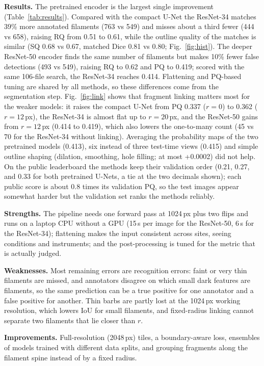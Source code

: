 \documentclass[sigconf]{acmart}
\begin{document}
\textbf{Results.} The pretrained encoder is the largest single improvement (Table~\ref{tab:results}). Compared with the compact U-Net the ResNet-34 matches 39\% more annotated filaments (763 vs 549) and misses about a third fewer (444 vs 658), raising RQ from 0.51 to 0.61, while the outline quality of the matches is similar (SQ 0.68 vs 0.67, matched Dice 0.81 vs 0.80; Fig.~\ref{fig:hist}). The deeper ResNet-50 encoder finds the same number of filaments but makes 10\% fewer false detections (493 vs 549), raising RQ to 0.62 and PQ to 0.419; scored with the same 106-file search, the ResNet-34 reaches 0.414. Flattening and PQ-based tuning are shared by all methods, so these differences come from the segmentation step. Fig.~\ref{fig:link} shows that fragment linking matters most for the weaker models: it raises the compact U-Net from PQ 0.337 ($r=0$) to 0.362 ($r=12$\,px), the ResNet-34 is almost flat up to $r=20$\,px, and the ResNet-50 gains from $r=12$\,px (0.414 to 0.419), which also lowers the one-to-many count (45 vs 70 for the ResNet-34 without linking). Averaging the probability maps of the two pretrained models (0.413), six instead of three test-time views (0.415) and simple outline shaping (dilation, smoothing, hole filling; at most +0.0002) did not help. On the public leaderboard the methods keep their validation order (0.21, 0.27, and 0.33 for both pretrained U-Nets, a tie at the two decimals shown); each public score is about 0.8 times its validation PQ, so the test images appear somewhat harder but the validation set ranks the methods reliably.

\textbf{Strengths.} The pipeline needs one forward pass at 1024\,px plus two flips and runs on a laptop CPU without a GPU (15\,s per image for the ResNet-50, 6\,s for the ResNet-34); flattening makes the input consistent across sites, seeing conditions and instruments; and the post-processing is tuned for the metric that is actually judged.

\textbf{Weaknesses.} Most remaining errors are recognition errors: faint or very thin filaments are missed, and annotators disagree on which small dark features are filaments, so the same prediction can be a true positive for one annotator and a false positive for another. Thin barbs are partly lost at the 1024\,px working resolution, which lowers IoU for small filaments, and fixed-radius linking cannot separate two filaments that lie closer than $r$.

\textbf{Improvements.} Full-resolution (2048\,px) tiles, a boundary-aware loss, ensembles of models trained with different data splits, and grouping fragments along the filament spine instead of by a fixed radius.
\end{document}
